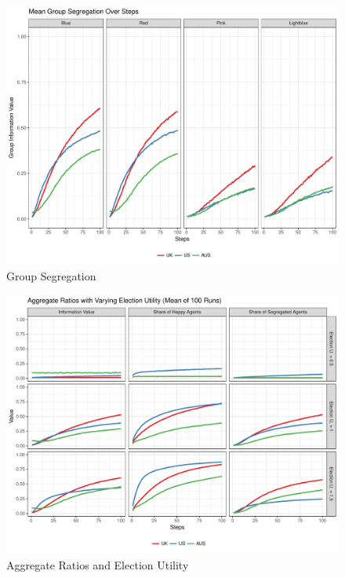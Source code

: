 \documentclass[12pt, a4paper]{article}
\begin{document}
	\begin{figure}[bp!]
		\centering
		\caption{Group Segregation}
		\includegraphics[scale=0.6]{./Plots/grp_ratios.pdf}
	\end{figure}
	
	\begin{figure}[bp!]
		\centering
		\caption{Aggregate Ratios and Election Utility}
		\includegraphics[scale=0.6]{./Plots/el_agg_ratios.pdf}
	\end{figure}
	
\end{document}
